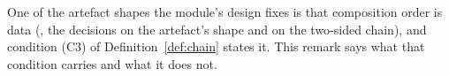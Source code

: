 
One of the artefact shapes the module's design fixes is that composition order
is data (,
the decisions on the artefact's shape and on the two-sided chain), and
condition (C3) of Definition~\ref{def:chain} states it. This remark says what
that condition carries and what it does not.

